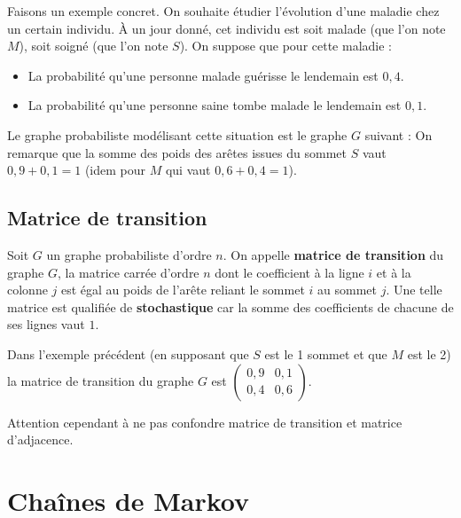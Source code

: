 	\begin{tip}[Exemple]
		Faisons un exemple concret. On souhaite étudier l'évolution d'une maladie chez un certain individu. À un jour donné, cet individu est soit malade (que l'on note $M$), soit soigné (que l'on note $S$). On suppose que pour cette maladie :
		\begin{itemize}
			\item La probabilité qu'une personne malade guérisse le lendemain est $0,4$.
			\item La probabilité qu'une personne saine tombe malade le lendemain est $0,1$.
		\end{itemize}
		Le graphe probabiliste modélisant cette situation est le graphe $G$ suivant :
		On remarque que la somme des poids des arêtes issues du sommet $S$ vaut $0,9+0,1 = 1$ (idem pour $M$ qui vaut $0,6+0,4 = 1$).
	\end{tip}

	\subsection{Matrice de transition}

	\begin{formula}[Définition]
		Soit $G$ un graphe probabiliste d'ordre $n$. On appelle \textbf{matrice de transition} du graphe $G$, la matrice carrée d'ordre $n$ dont le coefficient à la ligne $i$ et à la colonne $j$ est égal au poids de l'arête reliant le sommet $i$ au sommet $j$.
		\newpar
		Une telle matrice est qualifiée de \textbf{stochastique} car la somme des coefficients de chacune de ses lignes vaut $1$.
	\end{formula}

	\begin{tip}[Exemple]
		Dans l'exemple précédent (en supposant que $S$ est le 1\ier{} sommet et que $M$ est le 2\ieme{}) la matrice de transition du graphe $G$ est $\displaystyle{\begin{pmatrix} 0,9 & 0,1 \\ 0,4 & 0,6 \end{pmatrix}}$.
	\end{tip}

	Attention cependant à ne pas confondre matrice de transition et matrice d'adjacence.

	\section{Chaînes de Markov}


